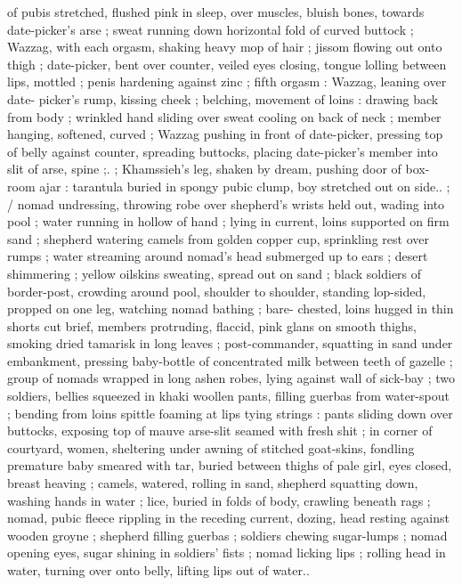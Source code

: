 of pubis stretched, flushed pink in sleep, over muscles, bluish bones,
towards date-picker's arse ; sweat running down horizontal fold of
curved buttock ; Wazzag, with each orgasm, shaking heavy mop of
hair ; jissom flowing out onto thigh ; date-picker, bent over counter,
veiled eyes closing, tongue lolling between lips, mottled ; penis
hardening against zinc ; fifth orgasm : Wazzag, leaning over date-
picker's rump, kissing cheek ; belching, movement of loins : drawing
back from body ; wrinkled hand sliding over sweat cooling on back of
neck ; member hanging, softened, curved ; Wazzag pushing in front
of date-picker, pressing top of belly against counter, spreading
buttocks, placing date-picker's member into slit of arse, spine ;. ;
Khamssieh's leg, shaken by dream, pushing door of box-room ajar :
tarantula buried in spongy pubic clump, boy stretched out on side.. ;
/ nomad undressing, throwing robe over shepherd's wrists held out,
wading into pool ; water running in hollow of hand ; lying in current,
loins supported on firm sand ; shepherd watering camels from
golden copper cup, sprinkling rest over rumps ; water streaming
around nomad’s head submerged up to ears ; desert shimmering ;
yellow oilskins sweating, spread out on sand ; black soldiers of
border-post, crowding around pool, shoulder to shoulder, standing
lop-sided, propped on one leg, watching nomad bathing ; bare-
chested, loins hugged in thin shorts cut brief, members protruding,
flaccid, pink glans on smooth thighs, smoking dried tamarisk in long
leaves ; post-commander, squatting in sand under embankment,
pressing baby-bottle of concentrated milk between teeth of gazelle
; group of nomads wrapped in long ashen robes, lying against wall
of sick-bay ; two soldiers, bellies squeezed in khaki woollen pants,
filling guerbas from water-spout ; bending from loins spittle foaming
at lips tying strings : pants sliding down over buttocks, exposing top
of mauve arse-slit seamed with fresh shit ; in corner of courtyard,
women, sheltering under awning of stitched goat-skins, fondling
premature baby smeared with tar, buried between thighs of pale girl,
eyes closed, breast heaving ; camels, watered, rolling in sand,
shepherd squatting down, washing hands in water ; lice, buried in
folds of body, crawling beneath rags ; nomad, pubic fleece rippling
in the receding current, dozing, head resting against wooden groyne
; shepherd filling guerbas ; soldiers chewing sugar-lumps ; nomad
opening eyes, sugar shining in soldiers’ fists ; nomad licking lips ;
rolling head in water, turning over onto belly, lifting lips out of water..
